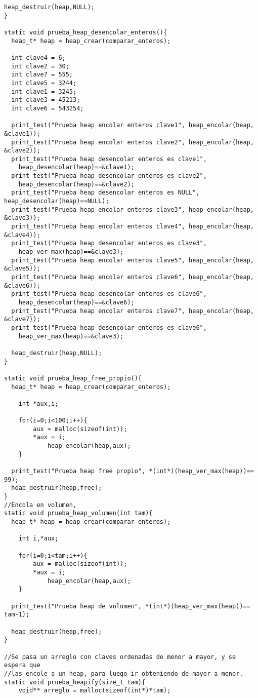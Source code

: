 \documentclass[11pt,a4paper]{article}
\begin{document}
\begin{lstlisting}[style= c]
  heap_destruir(heap,NULL);
}

static void prueba_heap_desencolar_enteros(){
  heap_t* heap = heap_crear(comparar_enteros);

  int clave4 = 6;
  int clave2 = 30;
  int clave7 = 555;
  int clave5 = 3244;
  int clave1 = 3245;
  int clave3 = 45213;
  int clave6 = 543254;
  
  print_test("Prueba heap encolar enteros clave1", heap_encolar(heap, &clave1));
  print_test("Prueba heap encolar enteros clave2", heap_encolar(heap, &clave2));
  print_test("Prueba heap desencolar enteros es clave1", 
    heap_desencolar(heap)==&clave1);
  print_test("Prueba heap desencolar enteros es clave2", 
    heap_desencolar(heap)==&clave2);
  print_test("Prueba heap desencolar enteros es NULL", heap_desencolar(heap)==NULL);
  print_test("Prueba heap encolar enteros clave3", heap_encolar(heap, &clave3));
  print_test("Prueba heap encolar enteros clave4", heap_encolar(heap, &clave4));
  print_test("Prueba heap desencolar enteros es clave3", 
    heap_ver_max(heap)==&clave3);
  print_test("Prueba heap encolar enteros clave5", heap_encolar(heap, &clave5));
  print_test("Prueba heap encolar enteros clave6", heap_encolar(heap, &clave6));
  print_test("Prueba heap desencolar enteros es clave6", 
    heap_desencolar(heap)==&clave6);
  print_test("Prueba heap encolar enteros clave7", heap_encolar(heap, &clave7));
  print_test("Prueba heap desencolar enteros es clave6", 
    heap_ver_max(heap)==&clave3);

  heap_destruir(heap,NULL);
}

static void prueba_heap_free_propio(){
  heap_t* heap = heap_crear(comparar_enteros);
  
	int *aux,i;

	for(i=0;i<100;i++){
		aux = malloc(sizeof(int));
		*aux = i;
    		heap_encolar(heap,aux);
	}

  print_test("Prueba heap free propio", *(int*)(heap_ver_max(heap))== 99);
  heap_destruir(heap,free);	
}
//Encola en volumen, 
static void prueba_heap_volumen(int tam){
  heap_t* heap = heap_crear(comparar_enteros);
  
	int i,*aux;

	for(i=0;i<tam;i++){
		aux = malloc(sizeof(int));
		*aux = i;
    		heap_encolar(heap,aux);
	}
	
  print_test("Prueba heap de volumen", *(int*)(heap_ver_max(heap))== tam-1);

  heap_destruir(heap,free);
}

//Se pasa un arreglo con claves ordenadas de menor a mayor, y se espera que 
//las encole a un heap, para luego ir obteniendo de mayor a menor.
static void prueba_heapify(size_t tam){
	void** arreglo = malloc(sizeof(int*)*tam);


\end{lstlisting}
\end{document}
